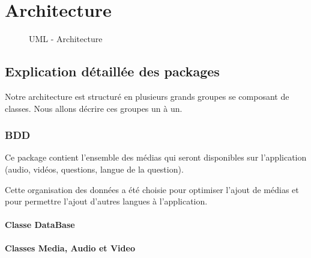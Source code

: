 \chapter{Architecture}
 
\begin{figure}[!h]
\begin{center}
  \caption{UML - Architecture}
  \label{diaglog} 
\end{center}
\end{figure}

\section{Explication détaillée des packages}

Notre architecture est structuré en plusieurs grands groupes se composant de classes. Nous allons décrire ces groupes un à un.

\subsection{BDD}

Ce package contient l'ensemble des médias qui seront disponibles sur l'application (audio, vidéos, questions, langue de la question).

Cette organisation des données a été choisie pour optimiser l'ajout de médias et pour permettre l'ajout d'autres langues à l'application.

\subsubsection{Classe DataBase}

\subsubsection{Classes Media, Audio et Video}

